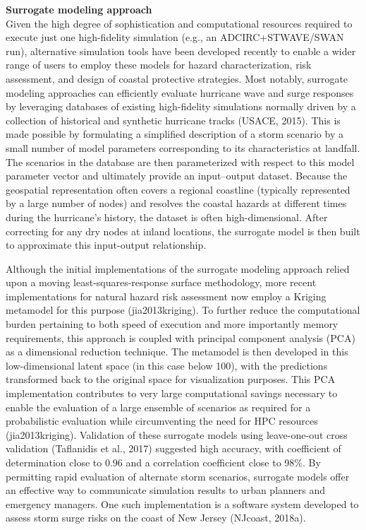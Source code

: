 \noindent\textbf{Surrogate modeling approach} \\Given the high degree of sophistication and computational resources required to execute just one high-fidelity simulation (e.g., an ADCIRC+STWAVE/SWAN run), alternative simulation tools have been developed recently to enable a wider range of users to employ these models for hazard characterization, risk assessment, and design of coastal protective strategies. Most notably, surrogate modeling approaches can efficiently evaluate hurricane wave and surge responses by leveraging databases of existing high-fidelity simulations normally driven by a collection of historical and synthetic hurricane tracks (USACE, 2015). This is made possible by formulating a simplified description of a storm scenario by a small number of model parameters corresponding to its characteristics at landfall. The scenarios in the database are then parameterized with respect to this model parameter vector and ultimately provide an input–output dataset. Because the geospatial representation often covers a regional coastline (typically represented by a large number of nodes) and resolves the coastal hazards at different times during the hurricane’s history, the dataset is often high-dimensional. After correcting for any dry nodes at inland locations, the surrogate model is then built to approximate this input-output relationship.

Although the initial implementations of the surrogate modeling approach relied upon a moving least-squares-response surface methodology, more recent implementations for natural hazard risk assessment now employ a Kriging metamodel for this purpose (jia2013kriging). To further reduce the computational burden pertaining to both speed of execution and more importantly memory requirements, this approach is coupled with principal component analysis (PCA) as a dimensional reduction technique. The metamodel is then developed in this low-dimensional latent space (in this case below 100), with the predictions transformed back to the original space for visualization purposes. This PCA implementation contributes to very large computational savings necessary to enable the evaluation of a large ensemble of scenarios as required for a probabilistic evaluation while circumventing the need for HPC resources (jia2013kriging). Validation of these surrogate models using leave-one-out cross validation (Taflanidis et al., 2017) suggested high accuracy, with coefficient of determination close to 0.96 and a correlation coefficient close to 98\%. By permitting rapid evaluation of alternate storm scenarios, surrogate models offer an effective way to communicate simulation results to urban planners and emergency managers. One such implementation is a software system developed to assess storm surge risks on the coast of New Jersey (NJcoast, 2018a).

